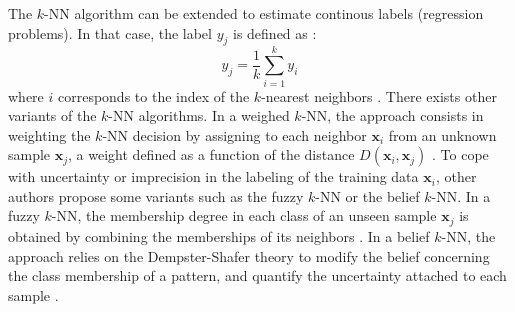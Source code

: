 The $k$-NN algorithm can be extended to estimate continous labels (regression problems). In that case, the label $y_j$ is defined as :
\begin{equation}
y_j = \frac{1}{k}\sum_{i=1}^{k} y_{i}
\end{equation}
where $i$ corresponds to the index of the $k$-nearest neighbors \cite{Altman1992}. There exists other variants of the $k$-NN algorithms. In a weighed $k$-NN, the approach consists in weighting the $k$-NN decision by assigning to each neighbor $\textbf{x}_i$ from an unknown sample $\textbf{x}_j$, a weight defined as a function of the distance $D(\textbf{x}_i, \textbf{x}_j)$ \cite{Dudani1976}. To cope with uncertainty or imprecision in the labeling of the training data $\textbf{x}_i$, other authors propose some variants such as the fuzzy $k$-NN or the belief $k$-NN. In a fuzzy $k$-NN, the membership degree in each class of an unseen sample $\textbf{x}_j$ is obtained by combining the memberships of its neighbors \cite{Keller1985}. In a belief $k$-NN, the approach relies on the Dempster-Shafer theory to modify the belief concerning the class membership of a pattern, and quantify the uncertainty attached to each sample \cite{Denoeux1995}.


